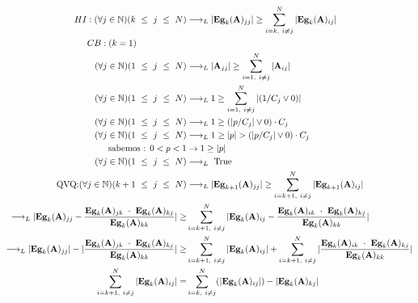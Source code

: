 \begin{align*}
    HI: (\forall j \in \mathbb{N}) (k \ \leq \ j \ \leq \ N ) &\longrightarrow_L |\textbf{Eg}_{k}(\textbf{A})_{jj}| \geq \sum_{i=k, \ i \neq j}^{N} |\textbf{Eg}_{k}(\textbf{A})_{ij}| \\
    \noindent CB: (k = 1) \ \ \ \ \ \ \ \ \ \ \ \ \ \ \ \ \ \\
    (\forall j \in \mathbb{N}) (1 \ \leq \ j \ \leq \ N ) &\longrightarrow_L |\textbf{A}_{jj}| \geq \sum_{i=1, \ i \neq j}^{N} |\textbf{A}_{ij}| \\
    (\forall j \in \mathbb{N}) (1 \ \leq \ j \ \leq \ N ) &\longrightarrow_L 1 \geq \sum_{i=1, \ i \neq j}^{N} |(1/C_j \vee 0)| \\
    (\forall j \in \mathbb{N}) (1 \ \leq \ j \ \leq \ N ) &\longrightarrow_L 1 \geq (|p/C_j| \vee 0) \cdot C_j \\
    (\forall j \in \mathbb{N}) (1 \ \leq \ j \ \leq \ N ) &\longrightarrow_L 1 \geq |p| > (|p/C_j| \vee 0) \cdot C_j \\
    \text{sabemos : } 0 < p < 1  &\rightarrow 1 \geq |p| \\
    (\forall j \in \mathbb{N}) (1 \ \leq \ j \ \leq \ N ) &\longrightarrow_L \ \text{True} \\ 
    \text{QVQ:} (\forall j \in \mathbb{N}) (k+1 \ \leq \ j \ \leq \ N ) &\longrightarrow_L |\textbf{Eg}_{k+1}(\textbf{A})_{jj}| \geq \sum_{i=k+1, \ i \neq j}^{N} |\textbf{Eg}_{k+1}(\textbf{A})_{ij}| \\
    \longrightarrow_L |\textbf{Eg}_{k}(\textbf{A})_{jj} - \frac {\textbf{Eg}_{k}(\textbf{A})_{jk} \ \cdot \ \textbf{Eg}_{k}(\textbf{A})_{kj}}{\textbf{Eg}_{k}(\textbf{A})_{kk}}| \geq &\sum_{i=k+1, \ i \neq j}^{N} |\textbf{Eg}_{k}(\textbf{A})_{ij} - \frac {\textbf{Eg}_{k}(\textbf{A})_{ik} \ \cdot \ \textbf{Eg}_{k}(\textbf{A})_{kj}}{\textbf{Eg}_{k}(\textbf{A})_{kk}}| \\
    \longrightarrow_L |\textbf{Eg}_{k}(\textbf{A})_{jj}| - |\frac {\textbf{Eg}_{k}(\textbf{A})_{jk} \ \cdot \ \textbf{Eg}_{k}(\textbf{A})_{kj}}{\textbf{Eg}_{k}(\textbf{A})_{kk}}| \geq &\sum_{i=k+1, \ i \neq j}^{N} |\textbf{Eg}_{k}(\textbf{A})_{ij}| +  \sum_{i=k+1, \ i \neq j}^{N} |\frac{\textbf{Eg}_{k}(\textbf{A})_{ik} \ \cdot \ \textbf{Eg}_{k}(\textbf{A})_{kj}}{\textbf{Eg}_{k}(\textbf{A})_{kk}}| \\
    \sum_{i=k+1, \ i \neq j}^{N} |\textbf{Eg}_{k}(\textbf{A})_{ij}| = &\sum_{i=k, \ i \neq j}^{N} (|\textbf{Eg}_{k}(\textbf{A})_{ij}|) -  |\textbf{Eg}_{k}(\textbf{A})_{kj}|\\

\end{align*}
